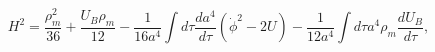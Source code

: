 \begin{equation}
H^2= \frac{\rho_m^2}{36}+\frac{U_B\rho_m}{12}-\frac{1}{16a^4}\int d\tau
\frac{da^4}{d\tau}(\dot\phi^2-2U)-\frac{1}{12a^4}\int d\tau a^4
\rho_m \frac{dU_B}{d\tau},
\end{equation}

